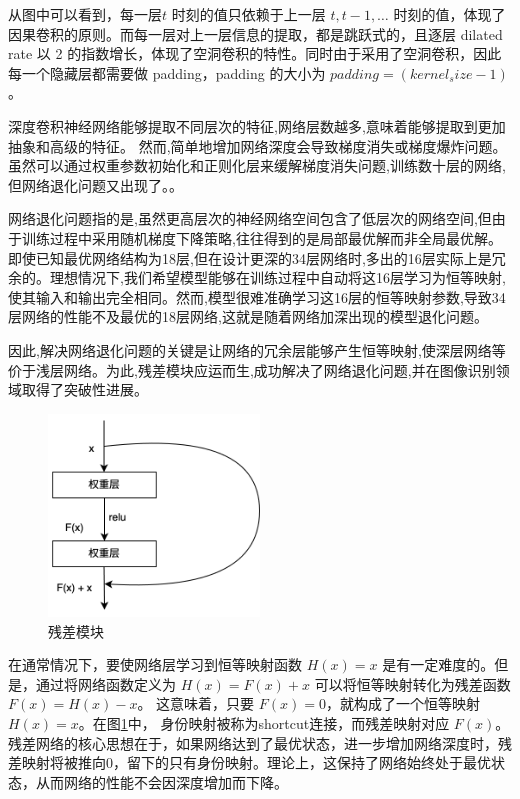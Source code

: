 从图中可以看到，每一层$t$ 时刻的值只依赖于上一层 $t, t - 1, \dots$ 时刻的值，体现了因果卷积的原则。而每一层对上一层信息的提取，都是跳跃式的，且逐层 dilated rate 以 2 的指数增长，体现了空洞卷积的特性。同时由于采用了空洞卷积，因此每一个隐藏层都需要做 padding，padding 的大小为 $padding = (kernel_size - 1)$。

深度卷积神经网络能够提取不同层次的特征,网络层数越多,意味着能够提取到更加抽象和高级的特征。
然而,简单地增加网络深度会导致梯度消失或梯度爆炸问题。虽然可以通过权重参数初始化和正则化层来缓解梯度消失问题,训练数十层的网络,但网络退化问题又出现了。\cite{吕国豪2014基于卷积神经网络的正则化方法}。

网络退化问题指的是,虽然更高层次的神经网络空间包含了低层次的网络空间,但由于训练过程中采用随机梯度下降策略,往往得到的是局部最优解而非全局最优解。
即使已知最优网络结构为18层,但在设计更深的34层网络时,多出的16层实际上是冗余的。理想情况下,我们希望模型能够在训练过程中自动将这16层学习为恒等映射,使其输入和输出完全相同。然而,模型很难准确学习这16层的恒等映射参数,导致34层网络的性能不及最优的18层网络,这就是随着网络加深出现的模型退化问题。

因此,解决网络退化问题的关键是让网络的冗余层能够产生恒等映射,使深层网络等价于浅层网络。为此,残差模块应运而生,成功解决了网络退化问题,并在图像识别领域取得了突破性进展。

\begin{figure}[htbp]
  \centering
  \includegraphics[width=0.5\textwidth]{figures/residual_block.png}
  \caption{残差模块}
  \label{residual_block}
\end{figure}

在通常情况下，要使网络层学习到恒等映射函数 $H(x) = x$ 是有一定难度的。但是，通过将网络函数定义为 $H(x) = F(x) + x$ 可以将恒等映射转化为残差函数 $F(x) = H(x) - x$。 这意味着，只要  $F(x) = 0$，就构成了一个恒等映射 $H(x) = x$。在图\ref{residual_block}中，
身份映射被称为shortcut连接，而残差映射对应 $F(x)$。残差网络的核心思想在于，如果网络达到了最优状态，进一步增加网络深度时，残差映射将被推向0，留下的只有身份映射。理论上，这保持了网络始终处于最优状态，从而网络的性能不会因深度增加而下降。

